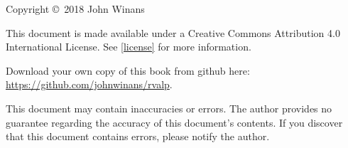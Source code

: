 \thispagestyle{plain}

Copyright \copyright\ 2018 John Winans 

This document is made available under a Creative Commons Attribution 4.0 
International License.  See \autoref{license} for more information.

Download your own copy of this book from github here: 
\url{https://github.com/johnwinans/rvalp}.

This document may contain inaccuracies or errors.  The author provides no 
guarantee regarding the accuracy of this document's contents.  If you 
discover that this document contains errors, please notify the author.
